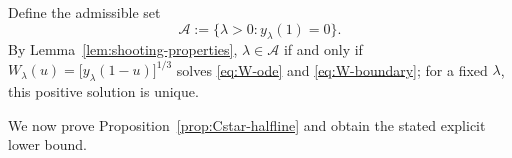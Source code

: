 \documentclass[12pt]{amsart}
\numberwithin{equation}{section}
\theoremstyle{plain}
\newtheorem{proposition}[theorem]{Proposition}
\theoremstyle{definition}
\newtheorem{remark}[theorem]{Remark}
\begin{document}
Define the admissible set
\[
 \mathcal A:=\{\lambda>0:y_\lambda(1)=0\}.
\]
By Lemma~\ref{lem:shooting-properties}, \(\lambda\in\mathcal A\) if and only if
$W_\lambda(u)=\bigl[y_\lambda(1-u)\bigr]^{1/3}$
solves \eqref{eq:W-ode} and \eqref{eq:W-boundary}; for a fixed \(\lambda\), this positive
solution is unique.

We now prove Proposition~\ref{prop:Cstar-halfline} and obtain the stated explicit lower bound.
\end{document}
